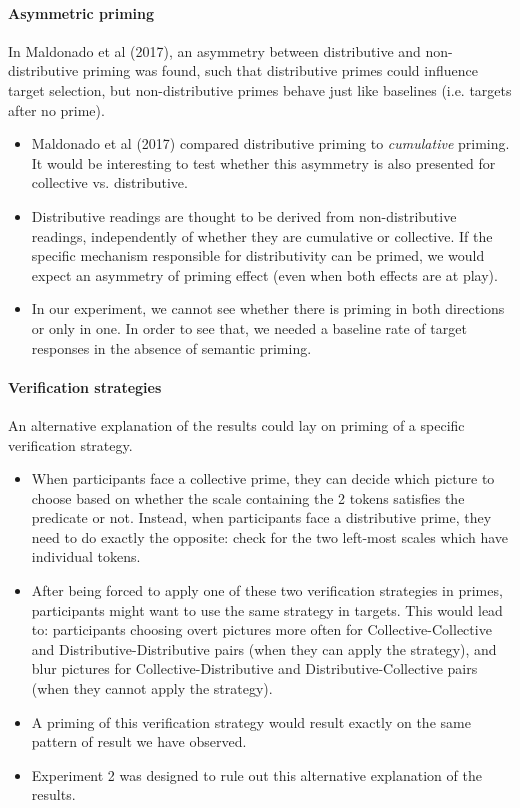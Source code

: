 \documentclass[a4paper, 11pt]{article}
\begin{document}
\paragraph{Asymmetric priming}
In Maldonado et al (2017), an asymmetry between distributive and non-distributive priming was found, such that distributive primes could influence target selection, but non-distributive primes behave just like baselines (i.e. targets after no prime). 
\begin{itemize}
\item Maldonado et al (2017) compared distributive priming to \emph{cumulative} priming. It would be interesting to test whether this asymmetry is also presented for collective vs. distributive. 

\item Distributive readings are thought to be derived from non-distributive readings, independently of whether they are cumulative or collective. If the specific mechanism responsible for distributivity can be primed, we would expect an asymmetry of priming effect (even when both effects are at play). 

\item In our experiment, we cannot see whether there is priming in both directions or only in one. In order to see that, we needed a baseline rate of target responses in the absence of semantic priming.

\end{itemize}

\paragraph{Verification strategies}
An alternative explanation of the results could lay on priming of a specific verification strategy. 

\begin{itemize}

\item When participants face a collective prime, they can decide which picture to choose based on whether the scale containing the 2 tokens satisfies the predicate or not. Instead, when participants face a distributive prime, they need to do exactly the opposite: check for the two left-most scales which have individual tokens. 

\item After being forced to apply one of these two verification strategies in primes, participants might want to use the same strategy in targets. This would lead to: participants choosing overt pictures more often for Collective-Collective and Distributive-Distributive pairs (when they can apply the strategy), and blur pictures for Collective-Distributive and Distributive-Collective pairs (when they cannot apply the strategy). 

\item A priming of this verification strategy would result exactly on the same pattern of result we have observed. 

\item Experiment 2 was designed to rule out this alternative explanation of the results. 

\end{itemize}
\end{document}
